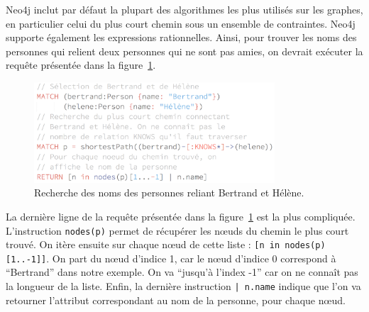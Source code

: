 		Neo4j inclut par défaut la plupart des algorithmes les plus utilisés sur les graphes, en particulier celui du plus court chemin sous un ensemble de contraintes. Neo4j supporte également les expressions rationnelles. Ainsi, pour trouver les noms des personnes qui relient deux personnes qui ne sont pas amies, on devrait exécuter la requête présentée dans la figure~\ref{connectingFriends}.
		
		\begin{figure}[H]
			\centering
			\includegraphics[width=0.8\textwidth]{images/connectingFriends.png}
			\caption{Recherche des noms des personnes reliant Bertrand et Hélène.}
			\label{connectingFriends}
		\end{figure}

		La dernière ligne de la requête présentée dans la figure~\ref{connectingFriends} est la plus compliquée. L'instruction \texttt{nodes(p)} permet de récupérer les nœuds du chemin le plus court trouvé. On itère ensuite sur chaque nœud de cette liste : \texttt{[n in nodes(p)[1..-1]]}. On part du nœud d'indice 1, car le nœud d'indice 0 correspond à \enquote{Bertrand} dans notre exemple. On va \enquote{jusqu'à l'index -1} car on ne connaît pas la longueur de la liste. Enfin, la dernière instruction \texttt{| n.name} indique que l'on va retourner l'attribut correspondant au nom de la personne, pour chaque nœud.

